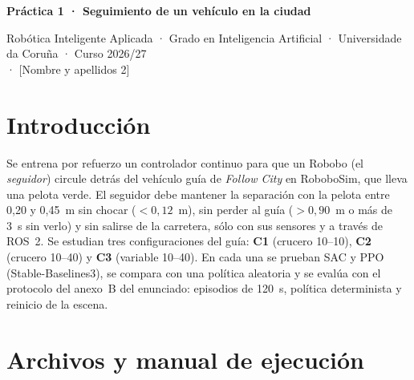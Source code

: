 \documentclass[11pt,a4paper]{article}
\begin{document}
{\Large\bfseries Práctica 1 · Seguimiento de un vehículo en la ciudad\par}
\vspace{2pt}
{\small Robótica Inteligente Aplicada · Grado en Inteligencia Artificial · Universidade da Coruña · Curso 2026/27\\
[Nombre y apellidos 1] · [Nombre y apellidos 2]\par}

\section{Introducción}

Se entrena por refuerzo un controlador continuo para que un Robobo (el \emph{seguidor}) circule detrás del
vehículo guía de \emph{Follow City} en RoboboSim, que lleva una pelota verde. El seguidor debe mantener la
separación con la pelota entre 0,20 y 0,45~m sin chocar ($<0{,}12$~m), sin perder al guía ($>0{,}90$~m o
más de 3~s sin verlo) y sin salirse de la carretera, sólo con sus sensores y a través de ROS~2. Se estudian
tres configuraciones del guía: \textbf{C1} (crucero 10--10), \textbf{C2} (crucero 10--40) y \textbf{C3}
(variable 10--40). En cada una se prueban SAC y PPO (Stable-Baselines3), se compara con una política
aleatoria y se evalúa con el protocolo del anexo~B del enunciado: episodios de 120~s, política determinista y
reinicio de la escena.

\section{Archivos y manual de ejecución}
\end{document}
